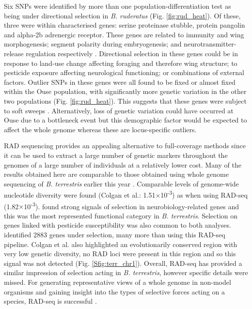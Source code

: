 \documentclass[12pt]{article}
\begin{document}
\begin{linenumbers}
    	Six SNPs were identified by more than one population-differentiation test as being under directional selection in \emph{B. ruderatus} (Fig. \ref{fig:rud_heat}). Of these, three were within characterised genes: serine proteinase stubble, protein pangolin and alpha-2b adrenergic receptor. 
    	These genes are related to immunity and wing morphogenesis; segment polarity during embryogenesis; and neurotransmitter-release regulation respectively \citep{brunner_pangolin_1997, bayer_genetic_2003, zou_comparative_2006, fujita_proteomic_2013}.
    	Directional selection in these genes could be in response to land-use change affecting foraging and therefore wing structure; to pesticide exposure affecting neurological functioning; or combinations of external factors. Outlier SNPs in these genes were all found to be fixed or almost fixed within the Ouse population, with significantly more genetic variation in the other two populations (Fig. \ref{fig:rud_heat}). This suggests that these genes were subject to soft sweeps \citep{hohenlohe_using_2010}. Alternatively, loss of genetic variation could have occurred at Ouse due to a bottleneck event but this demographic factor would be expected to affect the whole genome whereas these are locus-specific outliers.
    	
    	
    	RAD sequencing provides an appealing alternative to full-coverage methods since it can be used to extract a large number of genetic markers throughout the genomes of a large number of individuals at a relatively lower cost. Many of the results obtained here are comparable to those obtained using whole genome sequencing of \emph{B. terrestris} earlier this year \citep{colgan_genomic_2022}. Comparable levels of genome-wide nucleotide diversity were found (Colgan et al.: 1.51$\times$10\textsuperscript{-3}) as when using RAD-seq (1.82$\times$10\textsuperscript{-3}). \cite{colgan_genomic_2022} found strong signals of selection in neurobiology-related genes and this was the most represented functional category in \emph{B. terrestris}. Selection on genes linked with pesticide susceptibility was also common to both analyses. \cite{colgan_genomic_2022} identified 2883 genes under selection, many more than using this RAD-seq pipeline. 
    	Colgan et al. also highlighted an evolutionarily conserved region with very low genetic diversity, no RAD loci were present in this region and so this signal was not detected (Fig. \ref{Sfig:terr_chr1}). Overall, RAD-seq has provided a similar impression of selection acting in \emph{B. terrestris}, however specific details were missed. For generating representative views of a whole genome in non-model organisms and gaining insight into the types of selective forces acting on a species, RAD-seq is successful \citep{catchen_unbroken_2017}. 
    	

\end{linenumbers}
\end{document}
